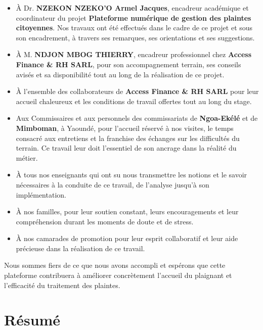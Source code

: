 \documentclass[12pt,a4paper,oneside]{extbook}
\begin{document}
\begin{itemize}

\item À Dr. \textbf{NZEKON NZEKO'O Armel Jacques}, encadreur académique et coordinateur du projet \textbf{Plateforme numérique de gestion des plaintes citoyennes}. Nos travaux ont été effectués dans le cadre de ce projet et sous son encadrement, à travers ses remarques, ses orientations et ses suggestions.

\item À M. \textbf{NDJON MBOG THIERRY}, encadreur professionnel chez \textbf{Access Finance \& RH SARL}, pour son accompagnement terrain, ses conseils avisés et sa disponibilité tout au long de la réalisation de ce projet.

\item À l'ensemble des collaborateurs de \textbf{Access Finance \& RH SARL} pour leur accueil chaleureux et les conditions de travail offertes tout au long du stage.

\item Aux Commissaires et aux personnels des commissariats de \textbf{Ngoa-Ekélé} et de \textbf{Mimboman}, à Yaoundé, pour l'accueil réservé à nos visites, le temps consacré aux entretiens et la franchise des échanges sur les difficultés du terrain. Ce travail leur doit l'essentiel de son ancrage dans la réalité du métier.

\item À tous nos enseignants qui ont su nous transmettre les notions et le savoir nécessaires à la conduite de ce travail, de l'analyse jusqu'à son implémentation.

\item À nos familles, pour leur soutien constant, leurs encouragements et leur compréhension durant les moments de doute et de stress.

\item À nos camarades de promotion pour leur esprit collaboratif et leur aide précieuse dans la réalisation de ce travail.

\end{itemize}
Nous sommes fiers de ce que nous avons accompli et espérons que cette plateforme contribuera à améliorer concrètement l'accueil du plaignant et l'efficacité du traitement des plaintes.

\chapter*{Résumé}
\end{document}
